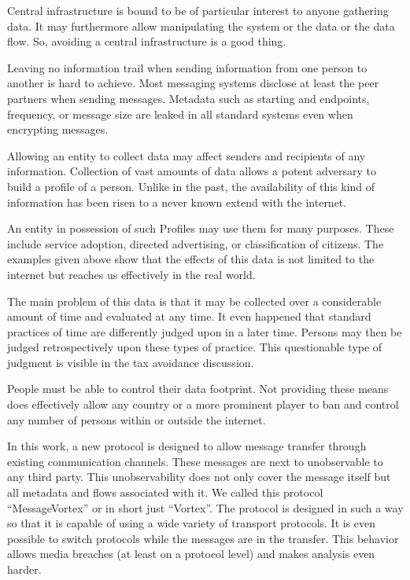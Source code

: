 Central infrastructure is bound to be of particular interest to anyone gathering data. It may furthermore allow manipulating the system or the data or the data flow. So, avoiding a central infrastructure is a good thing.

Leaving no information trail when sending information from one person to another is hard to achieve. Most messaging systems disclose at least the peer partners when sending messages. Metadata such as starting and endpoints, frequency, or message size are leaked in all standard systems even when encrypting messages.

Allowing an entity to collect data may affect senders and recipients of any information. Collection of vast amounts of data allows a potent adversary to build a  profile of a person. Unlike in the past, the availability of this kind of information has been risen to a never known extend with the internet.

An entity in possession of such Profiles may use them for many purposes. These include service adoption, directed advertising, or classification of citizens. The examples given above show that the effects of this data is not limited to the internet but reaches us effectively in the real world.

The main problem of this data is that it may be collected over a considerable amount of time and evaluated at any time. It even happened that standard practices of time are differently judged upon in a later time. Persons may then be judged retrospectively upon these types of practice. This questionable type of judgment is visible in the tax avoidance discussion. 

People must be able to control their data footprint. Not providing these means does effectively allow any country or a more prominent player to ban and control any number of persons within or outside the internet. 

In this work, a new protocol is designed to allow message transfer through existing communication channels. These messages are next to unobservable to any third party. This unobservability does not only cover the message itself but all metadata and flows associated with it. We called this protocol ``MessageVortex'' or in short just ``Vortex''. The protocol is designed in such a way so that it is capable of using a wide variety of transport protocols. It is even possible to switch protocols while the messages are in the transfer. This behavior allows media breaches (at least on a protocol level) and makes analysis even harder.

